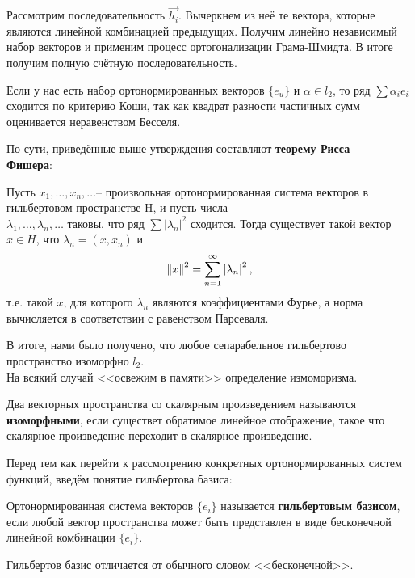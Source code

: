 \documentclass[12pt]{article}
\begin{document}
	Рассмотрим последовательность $\vec{h_i}$. Вычеркнем из неё те вектора, которые являются линейной комбинацией предыдущих.
	Получим линейно независимый набор векторов и применим процесс ортогонализации Грама-Шмидта. В итоге получим полную счётную 
	последовательность.
	
	Если у нас есть набор ортонормированных векторов $\{ e_u \}$ и $\alpha \in l_2$, то ряд $\sum \alpha_i e_i$ сходится по 
	критерию Коши, так как квадрат разности частичных сумм оценивается неравенством Бесселя.
	
	По сути, приведённые выше утверждения составляют \textbf{теорему Рисса --- Фишера}:
	\begin{theorem}
		Пусть $x_1, \dots ,x_n, \dots $-- произвольная ортонормированная система векторов в гильбертовом пространстве H, и пусть 
		числа \\
		$\lambda _1, \dots ,\lambda _n, \dots $ таковы, что ряд $\sum |\lambda_n|^2$ сходится. Тогда существует такой 
		вектор $x\in H$, что $\lambda _n=(x,x_n)$ и
		$$
			\left\| x \right\| ^2=\sum_{n=1}^{\infty } \left| \lambda_n \right|^2,
		$$
		т.е. такой $x$, для которого $\lambda_n$ являются коэффициентами Фурье, а норма вычисляется в 
		соответствии с равенством Парсеваля. 
	\end{theorem}
	
	В итоге, нами было получено, что любое сепарабельное гильбертово пространство изоморфно $l_2$. \\
	На всякий случай <<освежим в памяти>> определение измоморизма.
	\begin{defi}
		Два векторных пространства со скалярным произведением называются 
		\textbf{изоморфными}, если существет обратимое линейное отображение, 
		такое что скалярное произведение переходит в скалярное произведение.
	\end{defi}
	
	Перед тем как перейти к рассмотрению конкретных ортонормированных систем функций, введём понятие гильбертова базиса:
	\begin{defi}
		Ортонормированная система векторов $\{ e_i \}$ называется \textbf{гильбертовым базисом}, если любой вектор
		пространства может быть представлен в виде бесконечной линейной комбинации $ \{ e_i \} $.
	\end{defi}
	
	{\color{gray} Гильбертов базис отличается от обычного словом <<бесконечной>>.}
	
\end{document}
